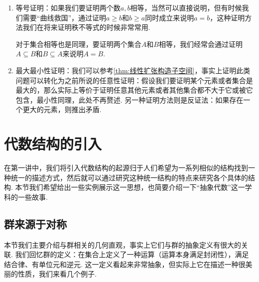 \begin{enumerate}
    \item 等号证明：如果我们要证明两个数$a,b$相等，当然可以直接说明，但有时候我们需要``曲线救国''，通过证明$a\geqslant b$和$b\geqslant a$同时成立来说明$a=b$，这种证明方法我们在将来证明秩不等式的时候非常常用.

          对于集合相等也是同理，要证明两个集合$A$和$B$相等，我们经常会通过证明$A\subseteq B$和$B\subseteq A$来说明$A=B$.

    \item 最大最小性证明：我们可以参考\autoref{thm:线性扩张构造子空间}，事实上证明此类问题可以转化为之前所说的任意性证明：假设我们要证明某个元素或者集合是最大的，那么实际上等价于证明任意其他元素或者其他集合都不大于它或被它包含，最小性同理，此处不再赘述. 另一种证明方法则是反证法：如果存在一个更大的元素，则推出矛盾.
\end{enumerate}

\section{代数结构的引入}

在第一讲中，我们将引入代数结构的起源归于人们希望为一系列相似的结构找到一种统一的描述方式，然后就可以通过研究这种统一结构的特点来研究各个具体的结构. 本节我们希望给出一些实例展示这一思想，也简要介绍一下``抽象代数''这一学科的一些故事.

\subsection{群来源于对称}

本节我们主要介绍与群相关的几何直观，事实上它们与群的抽象定义有很大的关联. 我们回忆群的定义：在集合上定义了一种运算（运算本身满足封闭性），满足结合律、有单位元和逆元. 这一定义看起来非常抽象，但实际上它在描述一种很美丽的性质，我们来看几个例子.

